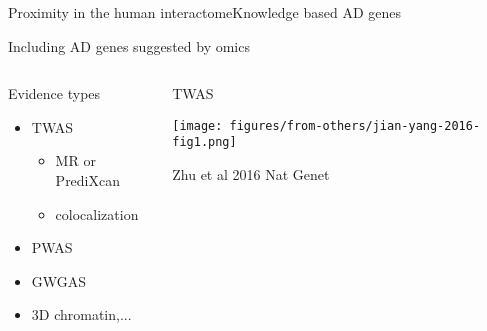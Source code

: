 \documentclass[aspectratio=169]{beamer}
\begin{document}
\begin{frame}{Proximity in the human interactome}{Knowledge based AD genes}
\end{frame}

\begin{frame}{Including AD genes suggested by omics}
\begin{columns}[t]
\begin{column}{0.4\textwidth}
\begin{center}
\large
Evidence types
\end{center}
\begin{itemize}
\item TWAS
\begin{itemize}
\item MR or PrediXcan
\item colocalization
\end{itemize}
\item PWAS
\item GWGAS
\item 3D chromatin,...
\end{itemize}
\end{column}

\begin{column}{0.7\textwidth}
\begin{center}
\large
TWAS
\end{center}

\texttt{[image: figures/from-others/jian-yang-2016-fig1.png]}

{\tiny Zhu et al 2016 Nat Genet}
\end{column}
\end{columns}
\end{frame}
\end{document}
